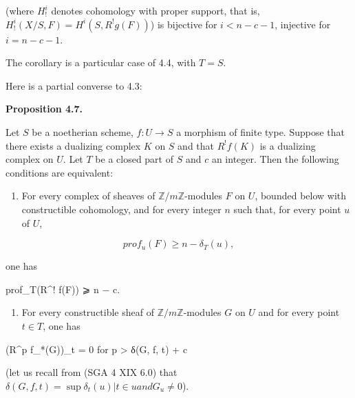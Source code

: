 \documentclass[
]{article}
\newenvironment{Shaded}{}{}
\newcommand{\NormalTok}[1]{#1}
\providecommand{\tightlist}{%
  \setlength{\itemsep}{0pt}\setlength{\parskip}{0pt}}
\begin{document}
(where \(H^{i}_{!}\) denotes cohomology with proper support, that is,
\(H^{i}_{!}(X/S, F) = H^{i}(S, R^{!} g(F))\)) is bijective for
\(i < n - c - 1\), injective for \(i = n - c - 1\).

The corollary is a particular case of 4.4, with \(T = S\).

Here is a partial converse to 4.3:

\textbf{Proposition 4.7.}

Let \(S\) be a noetherian scheme, \(f : U \to S\) a morphism of finite
type. Suppose that there exists a dualizing complex \(K\) on \(S\) and
that \(R^{!} f(K)\) is a dualizing complex on \(U\). Let \(T\) be a
closed part of \(S\) and \(c\) an integer. Then the following conditions
are equivalent:

\begin{enumerate}
\def\labelenumi{(\roman{enumi})}
\tightlist
\item
  For every complex of sheaves of \(\mathbb{Z}/m\mathbb{Z}\)-modules
  \(F\) on \(U\), bounded below with constructible cohomology, and for
  every integer \(n\) such that, for every point \(u\) of \(U\),
\end{enumerate}

\[
prof_{u}(F) \geqslant n - \delta_{T}(u),
\]

one has

\begin{Shaded}
\begin{Highlighting}[]
\NormalTok{prof\_T(R\^{}! f(F)) ⩾ n − c.}
\end{Highlighting}
\end{Shaded}

\begin{enumerate}
\def\labelenumi{(\roman{enumi})}
\setcounter{enumi}{1}
\tightlist
\item
  For every constructible sheaf of \(\mathbb{Z}/m\mathbb{Z}\)-modules
  \(G\) on \(U\) and for every point \(t \in T\), one has
\end{enumerate}

\begin{Shaded}
\begin{Highlighting}[]
\NormalTok{(R\^{}p f\_*(G))\_t = 0 for p \textgreater{} δ(G, f, t) + c}
\end{Highlighting}
\end{Shaded}

(let us recall from (SGA 4 XIX 6.0) that
\(\delta(G, f, t) = \sup{\delta_{t}(u) | t \in {u} and G_{u} \neq 0}\)).
\end{document}

